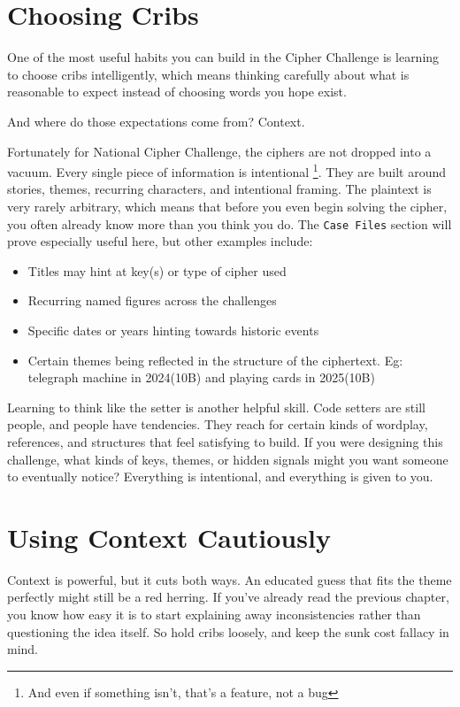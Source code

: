 \section{Choosing Cribs}

One of the most useful habits you can build in the Cipher Challenge is learning to choose cribs intelligently, which means thinking carefully about what is reasonable to expect instead of choosing words you hope exist. 

And where do those expectations come from? Context.

Fortunately for National Cipher Challenge, the ciphers are not dropped into a vacuum. Every single piece of information is intentional \footnote{And even if something isn't, that's a feature, not a bug}. They are built around stories, themes, recurring characters, and intentional framing. The plaintext is very rarely arbitrary, which means that before you even begin solving the cipher, you often already know more than you think you do. The \texttt{Case Files} section will prove especially useful here, but other examples include: 

\begin{itemize}
    \item Titles may hint at key(s) or type of cipher used 
    \item Recurring named figures across the challenges 
    \item Specific dates or years hinting towards historic events
    \item Certain themes being reflected in the structure of the ciphertext. Eg: telegraph machine in 2024(10B) and playing cards in 2025(10B) 
\end{itemize}

Learning to think like the setter is another helpful skill. Code setters are still people, and people have tendencies. They reach for certain kinds of wordplay, references, and structures that feel satisfying to build. If you were designing this challenge, what kinds of keys, themes, or hidden signals might you want someone to eventually notice? Everything is intentional, and everything is given to you. 

\section{Using Context Cautiously}

Context is powerful, but it cuts both ways. An educated guess that fits the theme perfectly might still be a red herring. If you've already read the previous chapter, you know how easy it is to start explaining away inconsistencies rather than questioning the idea itself. So hold cribs loosely, and keep the sunk cost fallacy in mind. 

